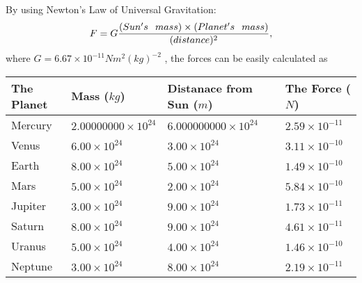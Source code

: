 \documentclass[12pt]{article}
\begin{document}
 
 
 
\noindent{}
 
 

By using Newton's Law of Universal Gravitation:
\[
F=G \frac{(Sun's \hspace{0.1in} mass) \times (Planet's \hspace{0.1in} mass)} { (distance)^2},
\]
where
$ G= %
6.67 \times 10^{-11}N m^{2}(kg)^{-2}$ , the forces can be easily calculated as
 
\vspace{0.2in}
 
 
\begin{tabular}{|l|l|l|l|}
\hline
The Planet & Mass ($kg$) & Distanace from Sun ($m$) & The Force ($N$)\\
\hline
Mercury  &
           $ %
2.00000000 \times 10^{24} $   &
             $ %
6.000000000 \times 10^{24} $    & $ %
2.59 \times 10^{-11} $
\\  \hline
Venus    &
           $  %
6.00 \times 10^{24}  $     &
             $ %
3.00 \times 10^{24} $    & $ %
3.11 \times 10^{-10} $
\\  \hline
Earth    &
           $  %
8.00 \times 10^{24}  $     &
             $ %
5.00 \times 10^{24} $    & $ %
1.49 \times 10^{-10} $
\\   \hline
Mars     &
           $  %
5.00 \times 10^{24} $     &
             $ %
2.00 \times 10^{24} $    & $ %
5.84 \times 10^{-10} $
\\   \hline
Jupiter  &
           $  %
3.00 \times 10^{24} $    &
             $ %
9.00 \times 10^{24} $    & $ %
1.73 \times 10^{-11} $
\\  \hline
Saturn   &
           $  %
8.00 \times 10^{24} $    &
             $ %
9.00 \times 10^{24}  $    & $ %
4.61 \times 10^{-11} $
\\  \hline
Uranus   &
           $  %
5.00 \times 10^{24} $    &
             $ %
4.00 \times 10^{24} $    & $ %
1.46 \times 10^{-10} $
\\  \hline
Neptune  &
           $  %
3.00 \times 10^{24} $    &
             $ %
8.00 \times 10^{24} $    & $ %
2.19 \times 10^{-11} $
\\  \hline
 
\end{tabular}
 
 
 
 
\noindent{}
 
\end{document}
